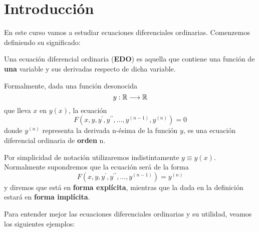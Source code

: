 \documentclass{mathnotes}
\title{\thetitle}
\author{\theauthor}
\date{Curso 2013 - 2014\\Universidad Autónoma de Madrid}
\begin{document}
\section{Introducción}

En este curso vamos a estudiar ecuaciones diferenciales ordinarias. Comenzemos definiendo su significado:

\begin{definition}
Una ecuación diferencial ordinaria (\textbf{EDO}) es aquella que contiene una función de \textbf{una} variable y sus derivadas respecto de dicha variable.

Formalmente, dada una función desonocida $$y: \mathbb{R} \longrightarrow \mathbb{R}$$ que lleva $x$ en $y(x)$, la ecuación $$F(x, y, y^\prime, y^{\prime\prime},\hdots, y^{(n-1)}, y^{(n)}) = 0$$ donde $y^{(n)}$ representa la derivada n-ésima de la función $y$, es una ecuación diferencial ordinaria de \textbf{orden} n.
\end{definition}

Por simplicidad de notación utilizaremos indistintamente $y \equiv y(x)$.
Normalmente supondremos que la ecuación será de la forma $$F(x, y, y^\prime,y^{\prime\prime},\hdots, y^{(n-1)}) =  y^{(n)}$$
y diremos que está en \textbf{forma explícita}, mientras que la dada en la definición estará en \textbf{forma implícita}.

Para entender mejor las ecuaciones diferenciales ordinarias y su utilidad, veamos los siguientes ejemplos:
\end{document}
